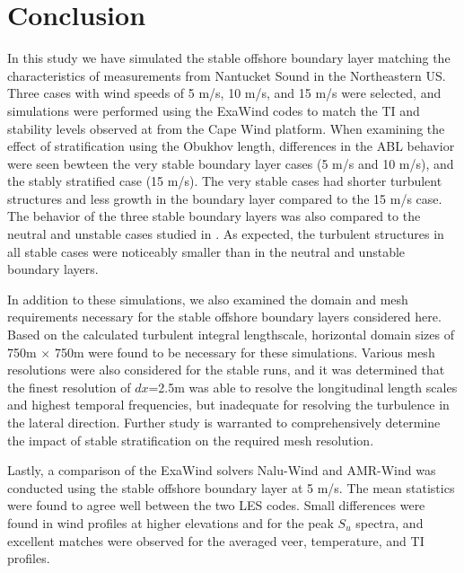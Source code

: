 \documentclass[conf]{new-aiaa}
\begin{document}
\section{Conclusion}
In this study we have simulated the stable offshore boundary layer
matching the characteristics of measurements from Nantucket Sound in
the Northeastern US.  Three cases with wind speeds of 5 m/s, 10 m/s,
and 15 m/s were selected, and simulations were performed using the
ExaWind codes to match the TI and stability levels observed at from
the Cape Wind platform.  When examining the effect of stratification
using the Obukhov length, differences in the ABL behavior were seen
bewteen the very stable boundary layer cases (5 m/s and 10 m/s), and
the stably stratified case (15 m/s).  The very stable cases had
shorter turbulent structures and less growth in the boundary layer
compared to the 15 m/s case.  The behavior of the three stable
boundary layers was also compared to the neutral and unstable cases
studied in \cite{cheung2020large}.  As expected, the turbulent
structures in all stable cases were noticeably smaller than in the
neutral and unstable boundary layers.

In addition to these simulations, we also examined the domain and mesh
requirements necessary for the stable offshore boundary layers
considered here.  Based on the calculated turbulent integral
lengthscale, horizontal domain sizes of 750m $\times$ 750m were found
to be necessary for these simulations.  Various mesh resolutions were
also considered for the stable runs, and it was determined that the
finest resolution of $dx$=2.5m was able to resolve the longitudinal
length scales and highest temporal frequencies, but inadequate for
resolving the turbulence in the lateral direction.  Further study is
warranted to comprehensively determine the impact of stable
stratification on the required mesh resolution.

Lastly, a comparison of the ExaWind solvers Nalu-Wind and AMR-Wind was
conducted using the stable offshore boundary layer at 5 m/s.  The mean
statistics were found to agree well between the two LES codes.  Small
differences were found in wind profiles at higher elevations and for
the peak $S_u$ spectra, and excellent matches were observed for the
averaged veer, temperature, and TI profiles.

\end{document}
